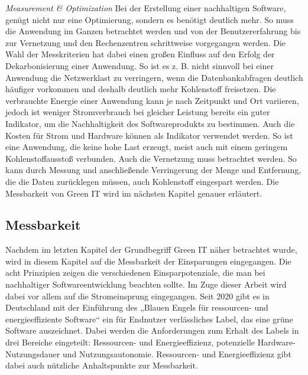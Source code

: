 \documentclass[utf8,biblatex]{lni}
\begin{document}
\textit{Measurement \& Optimization} \newline
Bei der Erstellung einer nachhaltigen Software, genügt nicht nur eine Optimierung, sondern es benötigt deutlich mehr. So muss die Anwendung im Ganzen betrachtet werden und von der Benutzererfahrung bis zur Vernetzung und den Rechenzentren schrittweise vorgegangen werden. Die Wahl der Messkriterien hat dabei einen großen Einfluss auf den Erfolg der Dekarbonisierung einer Anwendung. So ist es z. B. nicht sinnvoll bei einer Anwendung die Netzwerklast zu verringern, wenn die Datenbankabfragen deutlich häufiger vorkommen und deshalb deutlich mehr Kohlenstoff freisetzen. Die verbrauchte Energie einer Anwendung kann je nach Zeitpunkt und Ort variieren, jedoch ist weniger Stromverbrauch bei gleicher Leistung bereits ein guter Indikator, um die Nachhaltigkeit des Softwareprodukts zu bestimmen. Auch die Kosten für Strom und Hardware können als Indikator verwendet werden. So ist eine Anwendung, die keine hohe Last erzeugt, meist auch mit einem geringem Kohlenstoffausstoß verbunden. Auch die Vernetzung muss betrachtet werden. So kann durch Messung und anschließende Verringerung der Menge und Entfernung, die die Daten zurücklegen müssen, auch Kohlenstoff eingespart werden. \cite{Principles21} Die Messbarkeit von Green IT wird im nächsten Kapitel genauer erläutert.

\subsection{Messbarkeit}
Nachdem im letzten Kapitel der Grundbegriff Green IT näher betrachtet wurde, wird in diesem Kapitel auf die Messbarkeit der Einsparungen eingegangen. Die acht Prinzipien zeigen die verschiedenen Einsparpotenziale, die man bei nachhaltiger Softwareentwicklung beachten sollte.  Im Zuge dieser Arbeit wird dabei vor allem auf die Stromeinsprung eingegangen. Seit 2020 gibt es in Deutschland mit der Einführung des „Blauen Engels für ressourcen- und energieeffiziente Software“ ein für Endnutzer verlässliches Label, das eine grüne Software auszeichnet. \cite{Guldner22} Dabei werden die Anforderungen zum Erhalt des Labels in drei Bereiche eingeteilt: Ressourcen- und Energieeffizienz, potenzielle Hardware-Nutzungsdauer und Nutzungsautonomie. Ressourcen- und Energieeffizienz gibt dabei auch nützliche Anhaltspunkte zur Messbarkeit.
\end{document}
